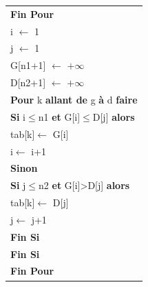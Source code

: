 \documentclass[10pt]{article}
\begin{document}
\begin{pseudo}
\begin{center}
\begin{tabular}{p{}}
\hspace{.4cm} \textbf{Fin Pour}\\
\hspace{.4cm} \textsf{i $\leftarrow$ 1}\\
\hspace{.4cm} \textsf{j $\leftarrow$ 1}\\
\hspace{.4cm} \textsf{G[n1+1] $\leftarrow$ $+\infty$}\\
\hspace{.4cm} \textsf{D[n2+1] $\leftarrow$ $+\infty$}\\
\hspace{.4cm} \textbf{Pour} \textsf{k} \textbf{allant de} \textsf{g} \textbf{à} \textsf{d} \textbf{faire}\\
\hspace{.8cm} \textbf{Si} \textsf{i$\leq$n1} \textbf{et} \textsf{G[i]$\leq$D[j]} \textbf{alors} \\
\hspace{1.2cm} \textsf{tab[k]$\leftarrow$ G[i]} \\
\hspace{1.2cm} \textsf{i$\leftarrow$ i+1} \\
\hspace{.8cm} \textbf{Sinon} \\
\hspace{1.2cm} \textbf{Si} \textsf{j$\leq$n2} \textbf{et} \textsf{G[i]>D[j]} \textbf{alors} \\
\hspace{1.6cm} \textsf{tab[k]$\leftarrow$ D[j]} \\
\hspace{1.6cm} \textsf{j$\leftarrow$ j+1} \\
\hspace{1.2cm} \textbf{Fin Si} \\
\hspace{.8cm} \textbf{Fin Si} \\
\hspace{.4cm}  \textbf{Fin Pour}\\
\hline
\end{tabular}
\end{center}
\end{pseudo}
\end{document}
